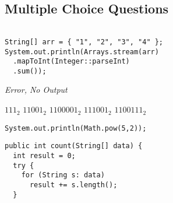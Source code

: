 \documentclass[11pt,addpoints]{exam}
\begin{document}
\begin{questions} %

\section{Multiple Choice Questions}



\question[1]{}

\begin{verbatim}

String[] arr = { "1", "2", "3", "4" };
System.out.println(Arrays.stream(arr)
  .mapToInt(Integer::parseInt)
  .sum());
\end{verbatim}

\begin{choices}
  \choice \textit{Error, No Output}
\end{choices}


\begin{choices}
  \choice $111_{2}$
  \choice $11001_{2}$
  \choice $1100001_{2}$
  \choice $111001_{2}$
  \choice $1100111_{2}$
\end{choices}

\question[1]{}

\begin{verbatim}
System.out.println(Math.pow(5,2));
\end{verbatim}

\begin{choices}
\end{choices}

\begin{minipage}{\textwidth}

\begin{verbatim}
public int count(String[] data) {
  int result = 0;
  try {
    for (String s: data)
      result += s.length();
  }


\end{verbatim}
\end{minipage}
\end{questions}
\end{document}
